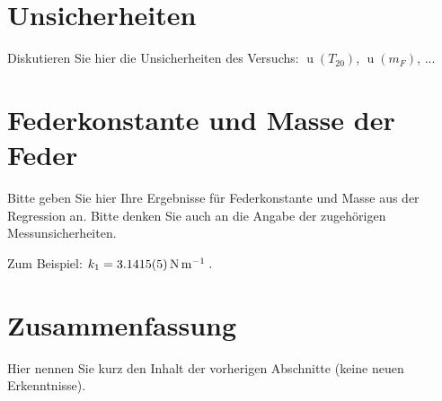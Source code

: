 \documentclass[ngerman]{scrartcl}
\begin{document}
\section{Unsicherheiten}
Diskutieren Sie hier die Unsicherheiten des Versuchs: $\operatorname{u}(T_{20})$, $\operatorname{u}(m_F)$, ...

\section{Federkonstante und Masse der Feder}
Bitte geben Sie hier Ihre Ergebnisse für Federkonstante und Masse aus der Regression an. Bitte denken Sie auch an die Angabe der zugehörigen Messunsicherheiten.

Zum Beispiel: \underline{\underline{$k_1=\SI{3,1415\pm0,0005}{\newton\per\meter}\;.$}}

\section{Zusammenfassung}
Hier nennen Sie kurz den Inhalt der vorherigen Abschnitte (keine neuen Erkenntnisse).
\end{document}

